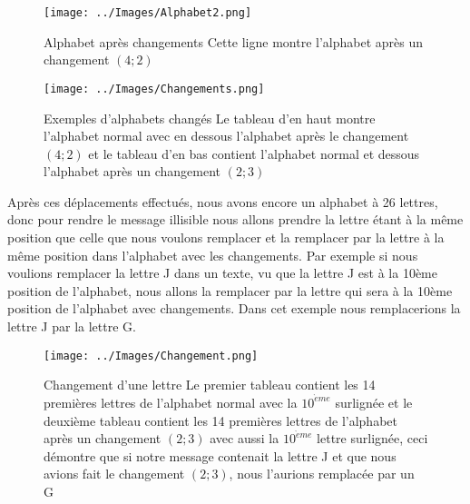 \documentclass[a4paper,12pt]{report}
\begin{document}
     \begin{figure}[h!]
     \begin{center}
     \texttt{[image: ../Images/Alphabet2.png]}  
     \end{center}
     \caption{Alphabet après changements \newline
     Cette ligne montre l'alphabet après un changement $(4;2)$}
     \end{figure}
     \newline
     \begin{figure}[h!]
     \begin{center}
      \texttt{[image: ../Images/Changements.png]} 
     \end{center}
     \caption{Exemples d'alphabets changés \newline
     Le tableau d'en haut montre l'alphabet normal avec en dessous l'alphabet après le changement $(4;2)$ et le tableau d'en bas contient l'alphabet normal et dessous l'alphabet après un changement $(2;3)$}
     \end{figure} \newline
     \newline
    \newline
    \newline
    \newline
     Après ces déplacements effectués, nous avons encore un alphabet à 26 lettres, donc pour rendre le message illisible nous allons prendre la lettre étant à la même position que celle que nous voulons remplacer et la remplacer par la lettre à la même position dans l'alphabet avec les changements.\newline
     Par exemple si nous voulions remplacer la lettre J dans un texte, vu que la lettre J est à la 10ème position de l'alphabet, nous allons la remplacer par la lettre qui sera à la 10ème position de l'alphabet avec changements. Dans cet exemple nous remplacerions la lettre J par la lettre G.
     \begin{figure}[h!]
     \begin{center}
      \texttt{[image: ../Images/Changement.png]}   
     \end{center}
     \caption{Changement d'une lettre \newline
     Le premier tableau contient les 14 premières lettres de l'alphabet normal avec la $10^{\grave{e}me}$ surlignée et le deuxième tableau contient les 14 premières lettres de l'alphabet après un changement $(2;3)$ avec aussi la $10^{\grave{e}me}$ lettre surlignée, ceci démontre que si notre message contenait la lettre J et que nous avions fait le changement $(2;3)$, nous l'aurions remplacée par un G}
     \end{figure}
\end{document}
